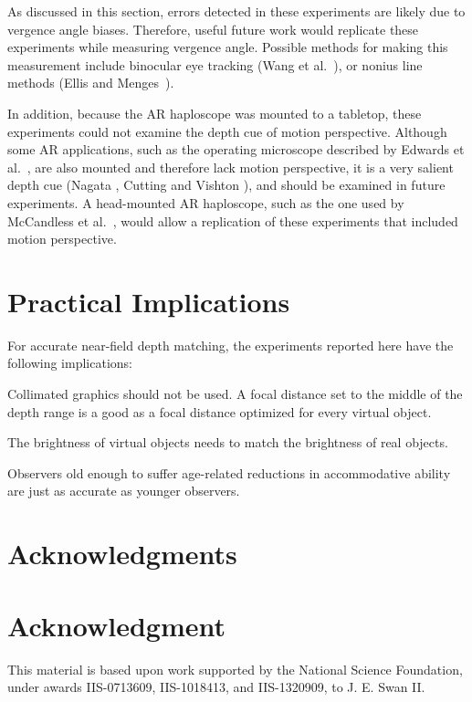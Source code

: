 \documentclass[10pt,journal,compsoc]{IEEEtran}
\makeatletter
\newcommand{\etal}{et al.\@\xspace} %
\newcommand{\ParLabel}[1]{\vspace{\topsep}\noindent{\sf\bfseries\small #1}}
\makeatother
\begin{document}
\ParLabel{Future Work:} As discussed in this section, errors detected in these experiments are likely due to vergence angle biases.  Therefore, useful future work would replicate these experiments while measuring vergence angle.  Possible methods for making this measurement  include binocular eye tracking (Wang \etal~\cite{duchowski:2014}), or nonius line methods (Ellis and Menges~\cite{ellis:1998}).  

In addition, because the AR haploscope was mounted to a tabletop, these experiments could not examine the depth cue of motion perspective.  Although some AR applications, such as the operating microscope described by Edwards \etal~\cite{edwards:2000}, are also mounted and therefore lack motion perspective, it is a very salient depth cue (Nagata \cite{nagata:1991}, Cutting and Vishton \cite{cutting:1995}), and should be examined in future experiments.  A head-mounted AR haploscope, such as the one used by McCandless \etal~\cite{mccandless:2000}, would allow a replication of these experiments that included motion perspective.

\section {Practical Implications}

For accurate near-field depth matching, the experiments reported here have the following implications:

\ParLabel{\textbullet} Collimated graphics should not be used.  A focal distance set to the middle of the depth range is a good as a focal distance optimized for every virtual object.

\ParLabel{\textbullet} The brightness of virtual objects needs to match the brightness of real objects.

\ParLabel{\textbullet} Observers old enough to suffer age-related reductions in accommodative ability are just as accurate as younger observers. 

\ifCLASSOPTIONcompsoc
  \section*{Acknowledgments}
\else
  \section*{Acknowledgment}
\fi

This material is based upon work supported by the National Science Foundation, under awards IIS-0713609, IIS-1018413, and IIS-1320909, to J. E. Swan II.
\end{document}
